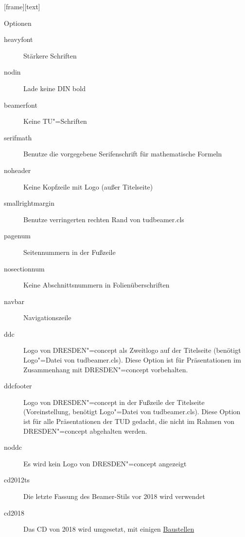 [frame][text]
\begin{frame}[allowframebreaks]{Optionen}
  \begin{description}
    \item[heavyfont] Stärkere Schriften
    \item[nodin] Lade keine {\dinfamily DIN bold}
    \item[beamerfont] Keine TU"=Schriften
    \item[serifmath] Benutze die vorgegebene Serifenschrift für mathematische Formeln
    \item[noheader] Keine Kopfzeile mit Logo (außer Titelseite)
    \item[smallrightmargin] Benutze verringerten rechten Rand von tudbeamer.cls
    \item[pagenum] Seitennummern in der Fußzeile
    \item[nosectionnum] Keine Abschnittsnummern in Folienüberschriften
    \item[navbar] Navigationszeile
    \item[ddc] Logo von DRESDEN"=concept als Zweitlogo auf der
      Titelseite (benötigt Logo"=Datei von tudbeamer.cls). Diese
      Option ist für Präsentationen im Zusammenhang mit DRESDEN"=concept
      vorbehalten.
    \item[ddcfooter] Logo von DRESDEN"=concept in der Fußzeile der
      Titelseite (Voreinstellung, benötigt Logo"=Datei von
      tudbeamer.cls). Diese Option ist für alle Präsentationen der TUD
      gedacht, die nicht im Rahmen von DRESDEN"=concept abgehalten
      werden.
    \item[noddc] Es wird kein Logo von DRESDEN"=concept angezeigt
    \item[cd2012ts] Die letzte Fassung des Beamer-Stils vor 2018 wird verwendet
    \item[cd2018] Das CD von 2018 wird umgesetzt, mit einigen \hyperref[baustellen]{Baustellen}
  \end{description}
\end{frame}


